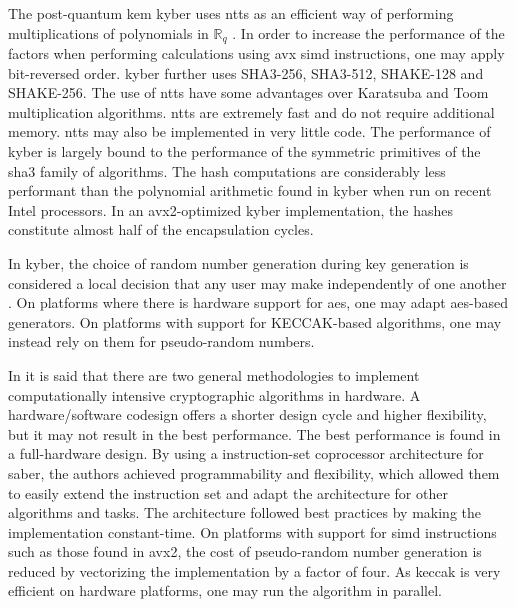 
The \gls{post-quantum} \gls{kem} \gls{kyber} uses \glspl{ntt} as an efficient way of performing multiplications of polynomials in $\mathbb{R}_q$ \cite{kyber2021}. In order to increase the performance of the factors when performing calculations using \gls{avx} \gls{simd} instructions, one may apply bit-reversed order. \gls{kyber} further uses SHA3-256, SHA3-512, SHAKE-128 and SHAKE-256. The use of \glspl{ntt} have some advantages over Karatsuba and Toom multiplication algorithms. \glspl{ntt} are extremely fast and do not require additional memory. \glspl{ntt} may also be implemented in very little code. The performance of \gls{kyber} is largely bound to the performance of the symmetric primitives of the \gls{sha3} family of algorithms. The hash computations are considerably less performant than the polynomial arithmetic found in \gls{kyber} when run on recent Intel processors. In an \gls{avx2}-optimized \gls{kyber} implementation, the hashes constitute almost half of the encapsulation cycles.

In \gls{kyber}, the choice of random number generation during key generation is considered a local decision that any user may make independently of one another \cite{kyber2021}. On platforms where there is hardware support for \gls{aes}, one may adapt \gls{aes}-based generators. On platforms with support for KECCAK-based algorithms, one may instead rely on them for pseudo-random numbers.


In \cite{roy2020} it is said that there are two general methodologies to implement computationally intensive cryptographic algorithms in hardware. A hardware/software codesign offers a shorter design cycle and higher flexibility, but it may not result in the best performance. The best performance is found in a full-hardware design. By using a instruction-set coprocessor architecture for \gls{saber}, the authors achieved programmability and flexibility, which allowed them to easily extend the instruction set and adapt the architecture for other algorithms and tasks. The architecture followed best practices by making the implementation constant-time. On platforms with support for \gls{simd} instructions such as those found in \gls{avx2}, the cost of pseudo-random number generation is reduced by vectorizing the implementation by a factor of four. As \gls{keccak} is very efficient on hardware platforms, one may run the algorithm in parallel.